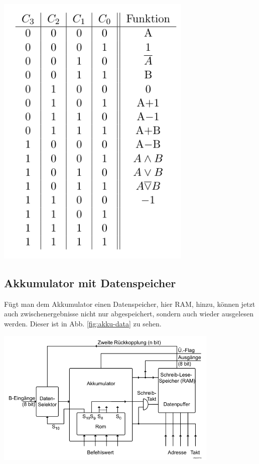 \documentclass[10pt]{article}
\newenvironment{Figure}
  {\par\medskip\noindent\minipage{\linewidth}}
  {\endminipage\par\medskip}
\begin{document}
\begin{multicols}{2}
\begin{Figure}
    \centering\includegraphics[width=0.7\textwidth]{sinvolle-alu-funktionen.png}
    \label{fig:alu-befehle}
  \end{Figure}
  \subsection{Akkumulator mit Datenspeicher}
  Fügt man dem Akkumulator einen Datenspeicher, hier RAM, hinzu, können jetzt auch zwischenergebnisse nicht nur abgespeichert, sondern auch wieder ausgelesen werden. Dieser ist in Abb. \ref{fig:akku-data} zu sehen.
  \begin{Figure}
    \centering\includegraphics[width=0.8\textwidth]{akku-und-datenspeicher.png}
    \label{fig:akku-data}
  \end{Figure}

\end{multicols}
\end{document}
